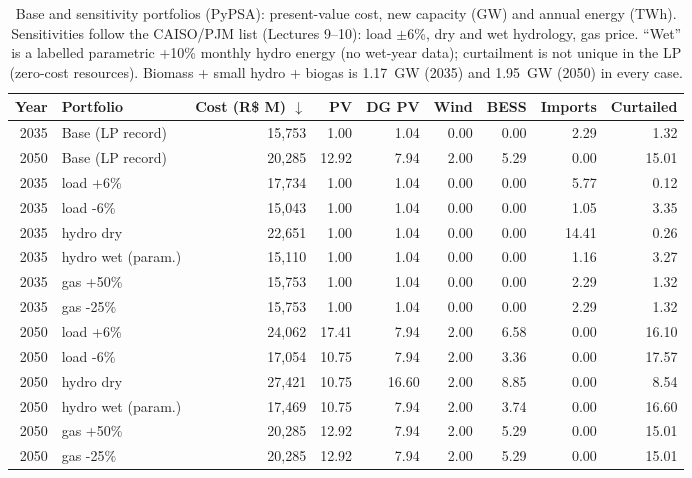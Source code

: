 \begin{table}[!htbp]
\centering
\footnotesize
\caption{Base and sensitivity portfolios (PyPSA): present-value cost, new capacity (GW) and annual energy (TWh). Sensitivities follow the CAISO/PJM list (Lectures 9--10): load $\pm$6\%, dry and wet hydrology, gas price. \enquote{Wet} is a labelled parametric +10\% monthly hydro energy (no wet-year data); curtailment is not unique in the LP (zero-cost resources). Biomass + small hydro + biogas is 1.17~GW (2035) and 1.95~GW (2050) in every case.}
\label{tab:portfolios}
\begin{adjustbox}{max width=\linewidth}
\begin{tabular}{rlrrrrrrr}
\toprule
Year & Portfolio & Cost (R\$ M) $\downarrow$ & PV & DG PV & Wind & BESS & Imports & Curtailed \\
\midrule
2035 & Base (LP record) & 15,753 & 1.00 & 1.04 & 0.00 & 0.00 & 2.29 & 1.32 \\
2050 & Base (LP record) & 20,285 & 12.92 & 7.94 & 2.00 & 5.29 & 0.00 & 15.01 \\
2035 & load +6\% & 17,734 & 1.00 & 1.04 & 0.00 & 0.00 & 5.77 & 0.12 \\
2035 & load -6\% & 15,043 & 1.00 & 1.04 & 0.00 & 0.00 & 1.05 & 3.35 \\
2035 & hydro dry & 22,651 & 1.00 & 1.04 & 0.00 & 0.00 & 14.41 & 0.26 \\
2035 & hydro wet (param.) & 15,110 & 1.00 & 1.04 & 0.00 & 0.00 & 1.16 & 3.27 \\
2035 & gas +50\% & 15,753 & 1.00 & 1.04 & 0.00 & 0.00 & 2.29 & 1.32 \\
2035 & gas -25\% & 15,753 & 1.00 & 1.04 & 0.00 & 0.00 & 2.29 & 1.32 \\
2050 & load +6\% & 24,062 & 17.41 & 7.94 & 2.00 & 6.58 & 0.00 & 16.10 \\
2050 & load -6\% & 17,054 & 10.75 & 7.94 & 2.00 & 3.36 & 0.00 & 17.57 \\
2050 & hydro dry & 27,421 & 10.75 & 16.60 & 2.00 & 8.85 & 0.00 & 8.54 \\
2050 & hydro wet (param.) & 17,469 & 10.75 & 7.94 & 2.00 & 3.74 & 0.00 & 16.60 \\
2050 & gas +50\% & 20,285 & 12.92 & 7.94 & 2.00 & 5.29 & 0.00 & 15.01 \\
2050 & gas -25\% & 20,285 & 12.92 & 7.94 & 2.00 & 5.29 & 0.00 & 15.01 \\
\bottomrule
\end{tabular}
\end{adjustbox}
\end{table}
